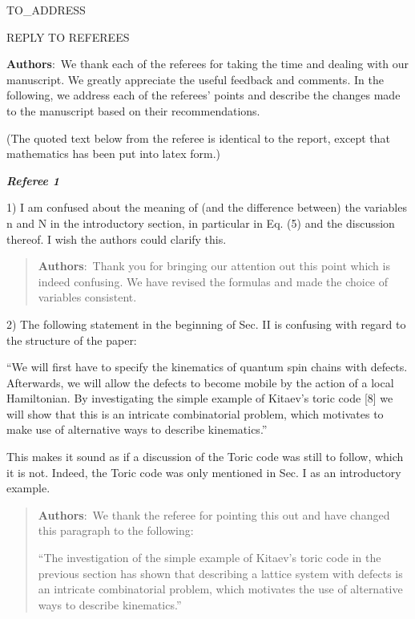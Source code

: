 \documentclass[a4paper,10pt]{letter}
\begin{document}
\begin{letter}{TO_ADDRESS}

	
\begin{center}
REPLY TO REFEREES
\end{center}

\textbf{Authors}:\ We thank each of the referees for taking the time and dealing with our manuscript. We greatly appreciate the useful feedback and comments. In the following, we address each of the referees' points and describe the changes made to the manuscript based on their recommendations.

(The quoted text below from the referee is identical to the report, except that mathematics has been put into latex form.)
\vspace{0.5cm}

\begin{center}
	\textit{\textbf{Referee 1}}
\end{center}


1) I am confused about the meaning of (and the difference between) the 
variables n and N in the introductory section, in particular in Eq. 
(5) and the discussion thereof. I wish the authors could clarify this. 

\begin{quote}
	\textbf{Authors}:\ Thank you for bringing our attention out this point which is indeed confusing. We have revised the formulas and made the choice of variables consistent.
\end{quote}

2) The following statement in the beginning of Sec. II is confusing 
with regard to the structure of the paper: 

``We will first have to specify the kinematics of quantum spin chains 
with defects. Afterwards, we will allow the defects to become mobile 
by the action of a local Hamiltonian. By investigating the simple 
example of Kitaev's toric code [8] we will show that this is an 
intricate combinatorial problem, which motivates to make use of 
alternative ways to describe kinematics.''

This makes it sound as if a discussion of the Toric code was still to 
follow, which it is not. Indeed, the Toric code was only mentioned in 
Sec. I as an introductory example. 

\begin{quote}
	\textbf{Authors}:\ We thank the referee for pointing this out and have changed this paragraph to the following:
		
	``The investigation of the simple example of Kitaev's toric code in the previous section has shown that describing a lattice system with defects is an intricate combinatorial problem, which motivates the use of alternative ways to describe kinematics.''
\end{quote}


\end{letter}
\end{document}
